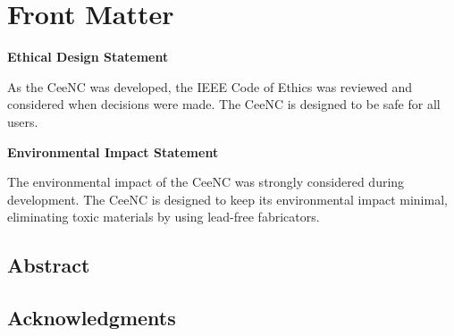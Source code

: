 \chapter{Front Matter}
\textbf{Ethical Design Statement}

As the CeeNC was developed, the IEEE Code of Ethics was reviewed and considered when decisions were made.
The CeeNC is designed to be safe for all users.

\textbf{Environmental Impact Statement}

The environmental impact of the CeeNC was strongly considered during development. 
The CeeNC is designed to keep its environmental impact minimal, eliminating toxic materials by using lead-free fabricators.

\section{Abstract}




\section{Acknowledgments}

